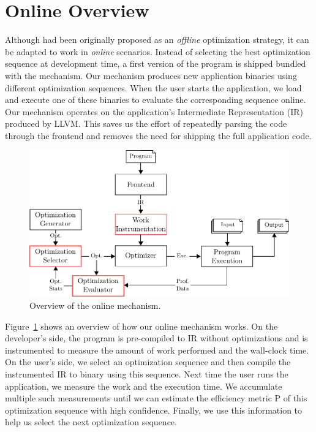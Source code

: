 \section{Online {\IterComp} Overview} \label{sec:oic-infra}

Although {\itercomp} had been originally proposed as an \textit{offline} optimization strategy, it can be adapted to work in
\textit{online} scenarios. Instead of selecting the best optimization sequence at development time, a first version of the program is
shipped bundled with the {\itercomp} mechanism. Our mechanism produces new application binaries using different optimization sequences.
When the user starts the application, we load and execute one of these binaries to evaluate the corresponding sequence online. Our
mechanism operates on the application's Intermediate Representation (IR) produced by LLVM. This saves us the effort of repeatedly parsing
the code through the frontend and removes the need for shipping the full application code.

\begin{figure}[t]
    \centering
    \includegraphics[width=\linewidth]{figs/infra-diagram}
    \caption{Overview of the online \itercomp mechanism.}
    \label{fig:infra-diagram}
\end{figure}

Figure~\ref{fig:infra-diagram} shows an overview of how our online {\itercomp} mechanism works. On the developer's side, the program is
pre-compiled to IR without optimizations and is instrumented to measure the amount of work performed and the wall-clock time. On the user's
side, we select an optimization sequence and then compile the instrumented IR to binary using this sequence. Next time the user runs the
application, we measure the work and the execution time. We accumulate multiple such measurements until we can estimate the efficiency
metric P of this optimization sequence with high confidence. Finally, we use this information to help us select the next optimization
sequence.


